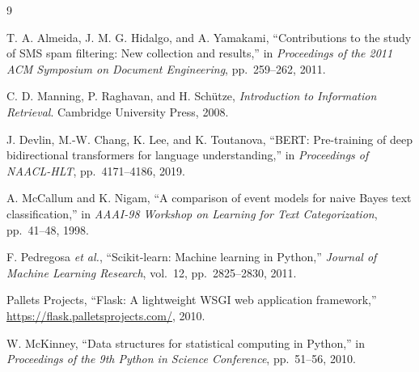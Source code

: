 \documentclass[paper=a4, fontsize=11pt]{scrartcl}
\numberwithin{equation}{section}
\numberwithin{figure}{section}
\numberwithin{table}{section}
\begin{document}
\begin{thebibliography}{9}

T. A. Almeida, J. M. G. Hidalgo, and A. Yamakami,
``Contributions to the study of SMS spam filtering: New collection and results,''
in \textit{Proceedings of the 2011 ACM Symposium on Document Engineering},
pp.~259--262, 2011.

C. D. Manning, P. Raghavan, and H. Sch\"{u}tze,
\textit{Introduction to Information Retrieval}.
Cambridge University Press, 2008.

J. Devlin, M.-W. Chang, K. Lee, and K. Toutanova,
``BERT: Pre-training of deep bidirectional transformers for language understanding,''
in \textit{Proceedings of NAACL-HLT}, pp.~4171--4186, 2019.

A. McCallum and K. Nigam,
``A comparison of event models for naive Bayes text classification,''
in \textit{AAAI-98 Workshop on Learning for Text Categorization},
pp.~41--48, 1998.

F. Pedregosa \textit{et al.},
``Scikit-learn: Machine learning in Python,''
\textit{Journal of Machine Learning Research},
vol.~12, pp.~2825--2830, 2011.

Pallets Projects,
``Flask: A lightweight WSGI web application framework,''
\url{https://flask.palletsprojects.com/}, 2010.

W. McKinney,
``Data structures for statistical computing in Python,''
in \textit{Proceedings of the 9th Python in Science Conference},
pp.~51--56, 2010.

\end{thebibliography}

\end{document}
